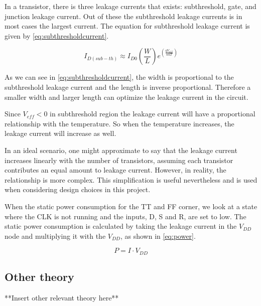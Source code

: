 In a transistor, there is three leakage currents that exists: subthreshold, gate, and
junction leakage current. Out of these the subthreshold leakage currents is in most cases the largest current. \cite{Analog_integrated} The equation for subthreshold leakage current is given by \autoref{eq:subthresholdcurrent}. 

\begin{equation}
    \label{eq:subthresholdcurrent}
    I_{D(sub-th)} \approx I_{D0}\left(\frac{W}{L}\right)e^{\left(\frac{qV_{eff}}{nkT}\right)}
\end{equation}

As we can see in \autoref{eq:subthresholdcurrent}, the width is proportional to the subthreshold leakage current and the length is inverse proportional. Therefore a smaller width and larger length can optimize the leakage current in the circuit.

Since $V_{eff} < 0$ in subthreshold region the leakage current will have a proportional relationship with the temperature. So when the temperature increases, the leakage current will increase as well. 

In an ideal scenario, one might approximate to say that the leakage current increases linearly with the number of transistors, assuming each transistor contributes an equal amount to leakage current. However, in reality, the relationship is more complex. This simplification is useful nevertheless and is used when considering design choices in this project.

When  the static power consumption for the TT and FF corner, we look at a state where the CLK is not running and the inputs, D, S and R, are set to low. The static power consumption is calculated by taking the leakage current in the $V_{DD}$ node and multiplying it with the $V_{DD}$, as shown in \autoref{eq:power}.

\begin{equation}
    \label{eq:power}
    P = I \cdot V_{DD}
\end{equation}

\subsection{Other theory}\label{subsec:theory_aSubsection}

**Insert other relevant theory here**




